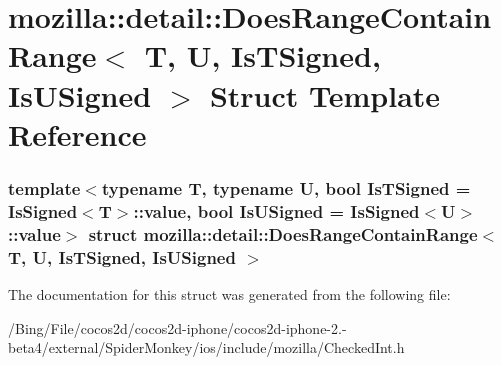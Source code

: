 \hypertarget{structmozilla_1_1detail_1_1_does_range_contain_range}{\section{mozilla\-:\-:detail\-:\-:Does\-Range\-Contain\-Range$<$ T, U, Is\-T\-Signed, Is\-U\-Signed $>$ Struct Template Reference}
\label{structmozilla_1_1detail_1_1_does_range_contain_range}
}
\subsubsection*{template$<$typename T, typename U, bool Is\-T\-Signed = Is\-Signed$<$\-T$>$\-::value, bool Is\-U\-Signed = Is\-Signed$<$\-U$>$\-::value$>$ struct mozilla\-::detail\-::\-Does\-Range\-Contain\-Range$<$ T, U, Is\-T\-Signed, Is\-U\-Signed $>$}



The documentation for this struct was generated from the following file\-:\begin{DoxyCompactItemize}
\item 
/\-Bing/\-File/cocos2d/cocos2d-\/iphone/cocos2d-\/iphone-\/2.-\/beta4/external/\-Spider\-Monkey/ios/include/mozilla/Checked\-Int.\-h\end{DoxyCompactItemize}
